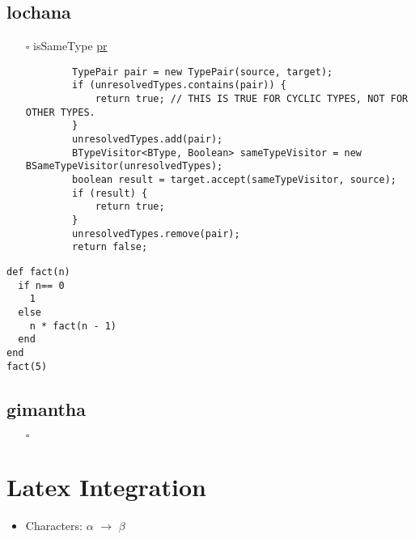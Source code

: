\documentclass[11pt]{article}
\begin{document}
\subsection{lochana}
\label{sec:org6db6870}
\begin{itemize}
\item[{$\square$}] isSameType \href{https://github.com/ballerina-platform/ballerina-lang/pull/35925}{pr}

\begin{verbatim}
        TypePair pair = new TypePair(source, target);
        if (unresolvedTypes.contains(pair)) {
            return true; // THIS IS TRUE FOR CYCLIC TYPES, NOT FOR OTHER TYPES.
        }
        unresolvedTypes.add(pair);
        BTypeVisitor<BType, Boolean> sameTypeVisitor = new BSameTypeVisitor(unresolvedTypes);
        boolean result = target.accept(sameTypeVisitor, source);
        if (result) {
            return true;
        }
        unresolvedTypes.remove(pair);
        return false;
\end{verbatim}
\end{itemize}

\begin{verbatim}
def fact(n)
  if n== 0
    1
  else
    n * fact(n - 1)
  end
end
fact(5)
\end{verbatim}

\subsection{gimantha}
\label{sec:org64cde31}
\begin{itemize}
\item[{$\square$}] 
\end{itemize}


\section{Latex Integration}
\label{sec:org7316255}

\begin{itemize}
\item Characters: \(\alpha\) \(\rightarrow\) \(\beta\)
\end{itemize}
\end{document}
